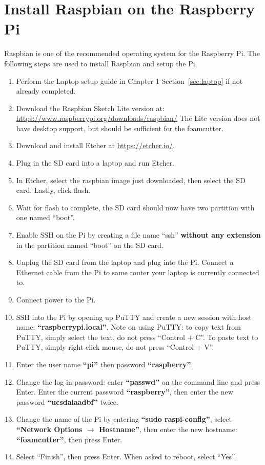 \documentclass[titlepage,12pt,letter]{report}
\numberwithin{equation}{chapter}
\begin{document}
\section{Install Raspbian on the Raspberry Pi}
Raspbian is one of the recommended operating system for the Raspberry Pi. The following steps are used to install Raspbian and setup the Pi.

\begin{enumerate}[itemsep = 5pt,topsep=0pt]
	\item Perform the Laptop setup guide in Chapter 1 Section~\ref{sec:laptop} if not already completed.
	\item Download the Raspbian Sketch Lite version at: \\ \href{https://www.raspberrypi.org/downloads/raspbian/}{https://www.raspberrypi.org/downloads/raspbian/} The Lite version does not have desktop support, but should be sufficient for the foamcutter.
	\item Download and install Etcher at \href{https://etcher.io/}{https://etcher.io/}.
	\item Plug in the SD card into a laptop and run Etcher.
	\item In Etcher, select the raspbian image just downloaded, then select the SD card. Lastly, click flash.
	\item Wait for flash to complete, the SD card should now have two partition with one named ``boot''.
	\item Enable SSH on the Pi by creating a file name ``ssh'' \textbf{without any extension} in the partition named ``boot'' on the SD card.
	\item Unplug the SD card from the laptop and plug into the Pi. Connect a Ethernet cable from the Pi to same router your laptop is currently connected to.
	\item Connect power to the Pi.
	\item SSH into the Pi by opening up PuTTY and create a new session with host name: \textbf{``raspberrypi.local''}. Note on using PuTTY: to copy text from PuTTY, simply select the text, do not press ``Control + C''. To paste text to PuTTY, simply right click mouse, do not press ``Control + V''.
	\item Enter the user name \textbf{``pi''} then password \textbf{``raspberry''}.
	\item Change the log in password: enter \textbf{``passwd''} on the command line and press Enter. Enter the current password \textbf{``raspberry''}, then enter the new password \textbf{``ucsdaiaadbf''} twice.
	\item Change the name of the Pi by entering \textbf{``sudo raspi-config''}, select \textbf{``Network Options $\rightarrow$ Hostname''}, then enter the new hostname: \textbf{``foamcutter''}, then press Enter.
	\item Select ``Finish'', then press Enter. When asked to reboot, select ``Yes''.
\end{enumerate}
\end{document}

